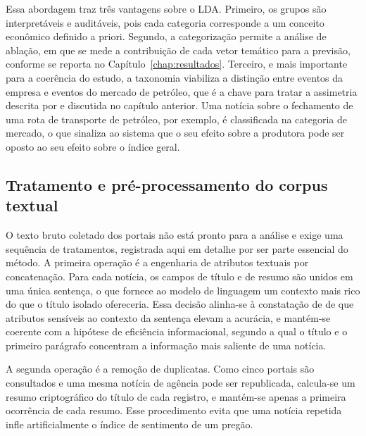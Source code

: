 Essa abordagem traz três vantagens sobre o LDA. Primeiro, os grupos são interpretáveis e auditáveis, pois cada categoria corresponde a um conceito econômico definido a priori. Segundo, a categorização permite a análise de ablação, em que se mede a contribuição de cada vetor temático para a previsão, conforme se reporta no Capítulo~\ref{chap:resultados}. Terceiro, e mais importante para a coerência do estudo, a taxonomia viabiliza a distinção entre eventos da empresa e eventos do mercado de petróleo, que é a chave para tratar a assimetria descrita por  e discutida no capítulo anterior. Uma notícia sobre o fechamento de uma rota de transporte de petróleo, por exemplo, é classificada na categoria de mercado, o que sinaliza ao sistema que o seu efeito sobre a produtora pode ser oposto ao seu efeito sobre o índice geral.

\subsection{Tratamento e pré-processamento do corpus textual}

O texto bruto coletado dos portais não está pronto para a análise e exige uma sequência de tratamentos, registrada aqui em detalhe por ser parte essencial do método. A primeira operação é a engenharia de atributos textuais por concatenação. Para cada notícia, os campos de título e de resumo são unidos em uma única sentença, o que fornece ao modelo de linguagem um contexto mais rico do que o título isolado ofereceria. Essa decisão alinha-se à constatação de  de que atributos sensíveis ao contexto da sentença elevam a acurácia, e mantém-se coerente com a hipótese de eficiência informacional, segundo a qual o título e o primeiro parágrafo concentram a informação mais saliente de uma notícia.

A segunda operação é a remoção de duplicatas. Como cinco portais são consultados e uma mesma notícia de agência pode ser republicada, calcula-se um resumo criptográfico do título de cada registro, e mantém-se apenas a primeira ocorrência de cada resumo. Esse procedimento evita que uma notícia repetida infle artificialmente o índice de sentimento de um pregão.

